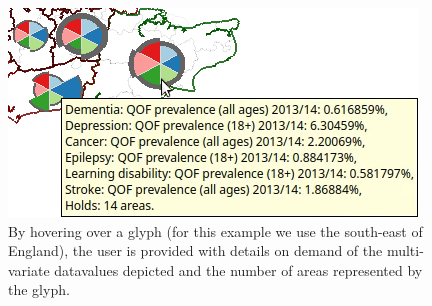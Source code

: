 \begin{figure}[t]
\centering
\includegraphics[width=0.5\linewidth]{images/ch5/onMouseOver} \vspace{-0.5cm}
\caption{By hovering over a glyph (for this example we use the south-east of England), the user is provided with details on demand of the multi-variate datavalues depicted and the number of areas represented by the glyph.} \label{fig:dod}
\end{figure}

